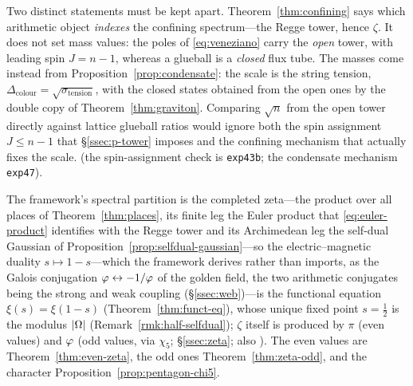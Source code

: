 \begin{remark}\label{rmk:glueball-check}
Two distinct statements must be kept apart. Theorem~\ref{thm:confining} says which arithmetic object
\emph{indexes} the confining spectrum---the Regge tower, hence $\zeta$. It does not set mass values:
the poles of \eqref{eq:veneziano} carry the \emph{open} tower, with leading spin $J=n-1$, whereas a
glueball is a \emph{closed} flux tube. The masses come instead from
Proposition~\ref{prop:condensate}: the scale is the string tension,
$\Delta_{\mathrm{colour}}=\sqrt{\sigma_{\mathrm{tension}}}$, with the closed states obtained from the
open ones by the double copy of Theorem~\ref{thm:graviton}. Comparing $\sqrt n$ from the open tower
directly against lattice glueball ratios would ignore both the spin assignment $J\le n-1$ that
\S\ref{ssec:p-tower} imposes and the confining mechanism that actually fixes the scale. (the
spin-assignment check is \texttt{exp43b}; the condensate mechanism \texttt{exp47}).
\end{remark}

\begin{theorem}\label{thm:duality}
The framework's spectral partition is the completed zeta---the product over all places of
Theorem~\ref{thm:places}, its finite leg the Euler product that \eqref{eq:euler-product} identifies
with the Regge tower and its Archimedean leg the self-dual Gaussian of
Proposition~\ref{prop:selfdual-gaussian}---so the electric--magnetic duality
$s\mapsto1-s$---which the framework derives rather than imports, as the Galois conjugation
$\varphi\leftrightarrow-1/\varphi$ of the golden field, the two arithmetic conjugates being the
strong and weak coupling (\S\ref{ssec:web})---is the functional equation $\xi(s)=\xi(1-s)$ (Theorem~\ref{thm:funct-eq}), whose
unique fixed point $s=\tfrac12$ is the modulus $\lvert\Omega\rvert$ (Remark~\ref{rmk:half-selfdual});
$\zeta$ itself is produced by $\pi$ (even values) and $\varphi$ (odd values, via $\chi_5$;
\S\ref*{ssec:zeta}; also \cite{F1,Elvang2026}). The even values are Theorem~\ref{thm:even-zeta}, the odd ones
Theorem~\ref{thm:zeta-odd}, and the character Proposition~\ref{prop:pentagon-chi5}.


\end{theorem}

